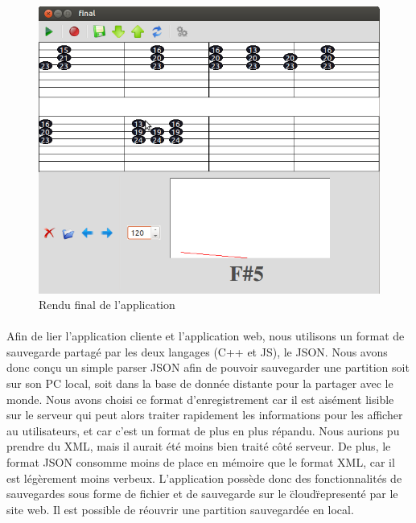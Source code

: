 \begin{figure}[H]
\centering
\includegraphics[scale=0.5]{RenduFinal}
\caption{Rendu final de l'application}
\end{figure}



\paragraph{}
Afin de lier l'application cliente et l'application web, nous utilisons un format de sauvegarde partagé par les deux 
langages (C++ et JS), le JSON. Nous avons donc conçu un simple parser JSON afin de pouvoir sauvegarder une partition 
soit sur son PC local, soit dans la base de donnée distante pour la partager avec le monde. Nous avons choisi 
ce format d'enregistrement car il est aisément lisible sur le serveur qui peut alors traiter rapidement les informations 
pour les afficher au utilisateurs, et car c'est un format de plus en plus répandu. Nous aurions pu prendre du XML, mais 
il aurait été moins bien traité côté serveur. De plus, le format JSON consomme moins de place en mémoire que le format XML,
car il est légèrement moins verbeux. L'application possède donc des fonctionnalités de sauvegardes sous forme de fichier et 
de sauvegarde sur le \"cloud\" representé par le site web. Il est possible de réouvrir une partition sauvegardée en local.

